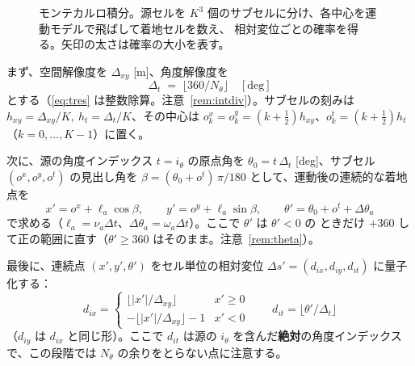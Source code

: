 \documentclass[11pt]{ltjsarticle}
\begin{document}
\begin{figure}[h]
\centering
{}
\caption{モンテカルロ積分。源セルを $K^3$ 個のサブセルに分け、各中心を運動モデルで飛ばして着地セルを数え、
相対変位ごとの確率を得る。矢印の太さは確率の大小を表す。}
\label{fig:mc}
\end{figure}

まず、空間解像度を $\Delta_{xy}$ [m]、角度解像度を
\begin{equation}
\Delta_t \;=\; \big\lfloor 360/N_\theta\big\rfloor \quad[\mathrm{deg}]
\label{eq:tres}
\end{equation}
とする（\eqref{eq:tres} は整数除算。注意~\ref{rem:intdiv}）。サブセルの刻みは
$h_{xy}=\Delta_{xy}/K,\ h_t=\Delta_t/K$、その中心は
$o^{x}_{k}=o^{y}_{k}=(k+\tfrac12)h_{xy}$、$o^{t}_{k}=(k+\tfrac12)h_t$（$k=0,\dots,K-1$）に置く。

次に、源の角度インデックス $t=i_\theta$ の原点角を $\theta_0=t\,\Delta_t$ [deg]、サブセル
$(o^x,o^y,o^t)$ の見出し角を $\beta=(\theta_0+o^t)\,\pi/180$ として、運動後の連続的な着地点を
\begin{equation}
x'=o^x+\ell_a\cos\beta,\qquad
y'=o^y+\ell_a\sin\beta,\qquad
\theta'=\theta_0+o^t+\Delta\theta_a
\label{eq:cont}
\end{equation}
で求める（$\ell_a=\nu_a\Delta t$、$\Delta\theta_a=\omega_a\Delta t$）。ここで $\theta'$ は $\theta'<0$ の
ときだけ $+360$ して正の範囲に直す（$\theta'\ge360$ はそのまま。注意~\ref{rem:theta}）。

最後に、連続点 $(x',y',\theta')$ をセル単位の相対変位 $\Delta s'=(d_{ix},d_{iy},d_{it})$ に量子化する：
\begin{equation}
d_{ix}=
\begin{cases}
\big\lfloor |x'|/\Delta_{xy}\big\rfloor & x'\ge 0\\[2pt]
-\big\lfloor |x'|/\Delta_{xy}\big\rfloor-1 & x'<0
\end{cases}
\qquad
d_{it}=\big\lfloor \theta'/\Delta_t\big\rfloor
\label{eq:celldelta}
\end{equation}
（$d_{iy}$ は $d_{ix}$ と同じ形）。ここで $d_{it}$ は源の $i_\theta$ を含んだ\textbf{絶対}の角度インデックス
で、この段階では $N_\theta$ の余りをとらない点に注意する。
\end{document}
